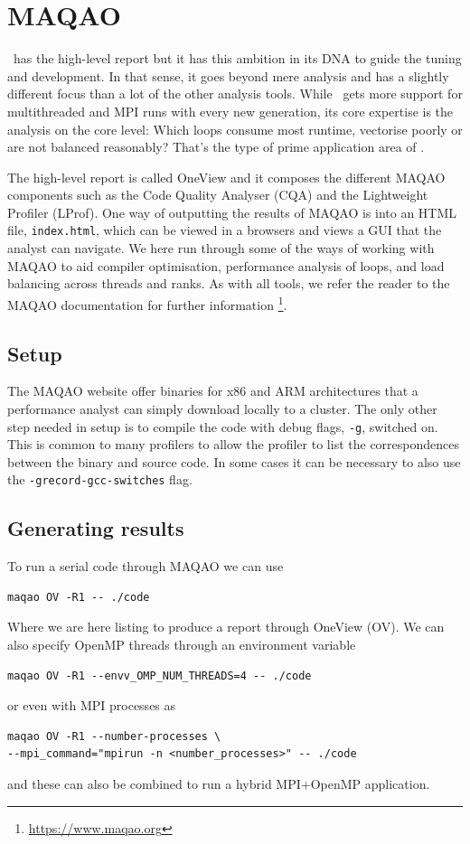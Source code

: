 \section{MAQAO} 
\label{section:localisation:maqao}

\maqao~has the high-level report but it has this ambition in its DNA to guide the tuning and development.
In that sense, it goes beyond mere analysis and has a slightly different focus than a lot of the other analysis tools.
While \maqao~gets more support for multithreaded and MPI runs with every new generation, its core expertise is the analysis on the core level:
Which loops consume most runtime, vectorise poorly or are not balanced reasonably?
That's the type of prime application area of \maqao.

The high-level report is called OneView and it composes the different MAQAO
components such as the Code Quality Analyser (CQA) and the Lightweight Profiler
(LProf). One way of outputting the results of MAQAO is into an HTML file,
\texttt{index.html}, which can be viewed in a browsers and views a GUI that the
analyst can navigate. We here run through some of the ways of working with
MAQAO to aid compiler optimisation, performance analysis of loops, and load
balancing across threads and ranks. As with all tools, we refer the reader to
the MAQAO documentation for further information
\footnote{\url{https://www.maqao.org}}.

\subsection{Setup}

The MAQAO website offer binaries for x86 and ARM architectures that a
performance analyst can simply download locally to a cluster. The only other
step needed in setup is to compile the code with debug flags, \texttt{-g},
switched on. This is common to many profilers to allow the profiler to list the
correspondences between the binary and source code. In some cases it can be
necessary to also use the \texttt{-grecord-gcc-switches} flag.

\subsection{Generating results}

To run a serial code through MAQAO we can use
\begin{verbatim}
maqao OV -R1 -- ./code
\end{verbatim}
Where we are here listing to produce a report through OneView (OV). We can also
specify OpenMP threads through an environment variable
\begin{verbatim}
maqao OV -R1 --envv_OMP_NUM_THREADS=4 -- ./code
\end{verbatim}
or even with MPI processes as 
\begin{verbatim}
maqao OV -R1 --number-processes \
--mpi_command="mpirun -n <number_processes>" -- ./code
\end{verbatim}
and these can also be combined to run a hybrid MPI+OpenMP application.

